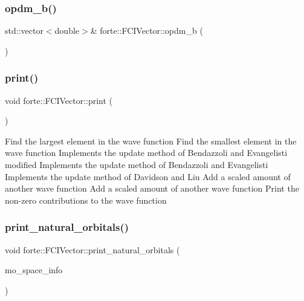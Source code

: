 \subsubsection{\texorpdfstring{opdm\+\_\+b()}{opdm\_b()}}
{\footnotesize\ttfamily std\+::vector$<$double$>$\& forte\+::\+F\+C\+I\+Vector\+::opdm\+\_\+b (\begin{DoxyParamCaption}{ }\end{DoxyParamCaption})\hspace{0.3cm}{\ttfamily [inline]}}

\mbox{\label{classforte_1_1_f_c_i_vector_aefc1a1762450009031c196c96bae636e}} 
\subsubsection{\texorpdfstring{print()}{print()}}
{\footnotesize\ttfamily void forte\+::\+F\+C\+I\+Vector\+::print (\begin{DoxyParamCaption}{ }\end{DoxyParamCaption})}

Find the largest element in the wave function Find the smallest element in the wave function Implements the update method of Bendazzoli and Evangelisti modified Implements the update method of Bendazzoli and Evangelisti Implements the update method of Davidson and Liu Add a scaled amount of another wave function Add a scaled amount of another wave function Print the non-\/zero contributions to the wave function \mbox{\label{classforte_1_1_f_c_i_vector_a21aab8b6dd3d6e3805352025f8b90c59}} 
\subsubsection{\texorpdfstring{print\+\_\+natural\+\_\+orbitals()}{print\_natural\_orbitals()}}
{\footnotesize\ttfamily void forte\+::\+F\+C\+I\+Vector\+::print\+\_\+natural\+\_\+orbitals (\begin{DoxyParamCaption}\item[{std\+::shared\+\_\+ptr$<$ \mbox{\hyperlink{classforte_1_1_m_o_space_info}{M\+O\+Space\+Info}} $>$}]{mo\+\_\+space\+\_\+info }\end{DoxyParamCaption})}

